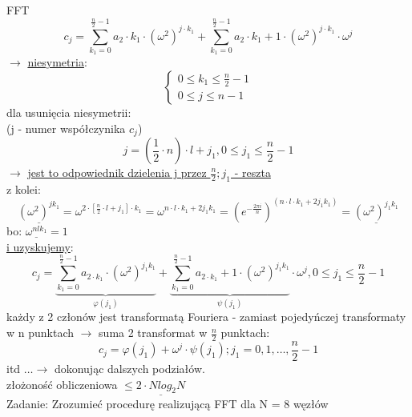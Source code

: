 \begin{frame}[allowframebreaks]{FFT}
	\[
		c_j = \sum\limits_{k_1=0}^{\frac{n}{2} - 1} a_2 \cdot k_1 \cdot (\omega^2)^{j \cdot k_1} + \sum\limits_{k_1 = 0}^{\frac{n}{2} - 1} a_2 \cdot k_1 + 1 \cdot (\omega^2)^{j \cdot k_1} \cdot \omega^j
		\tag{16.24}
	\]
	$\to$ \underline{niesymetria}: \\
	\[
	\begin{cases}
		0 \leq k_1 \leq \frac{n}{2} - 1 \\
		0 \leq j \leq n-1
	\end{cases}
	\tag{16.25}
	\]
	dla usunięcia niesymetrii: \\
	(j - numer współczynika $c_j$)
	\[
		j = (\frac{1}{2} \cdot n) \cdot l + j_1, 0 \leq j_1 \leq \frac{n}{2} - 1
	\]
	$\to$ \underline{jest to odpowiednik dzielenia j przez $\frac{n}{2} ; j_1$ - reszta} \\
	z kolei:
	\[
		\underline{(\omega^2)^{jk_1}} = \omega^{2 \cdot [\frac{n}{2} \cdot l + j_1] \cdot k_1} = \omega^{n \cdot l \cdot k_1 + 2j_1k_1} = (e^{-\frac{2\pi i}{n}})^{(n \cdot l \cdot k_1 + 2j_1k_1)} = \underline{(\omega^2)^{j_1k_1}}
		\tag{16.26}
	\]
	bo: $\underline{\omega^{nlk_1}} = 1$ \\
	\underline{i uzyskujemy}:
	\[
		c_j = \underbrace{\sum\limits_{k_1 = 0}^{\frac{n}{2} - 1} a_{2 \cdot k_1} \cdot (\omega^2)^{j_1k_1}}_{\varphi(j_1)} + \underbrace{ \sum\limits_{k_1 = 0}^{\frac{n}{2}-1} a_{2 \cdot k_1} + 1 \cdot (\omega^2)^{j_1k_1}}_{\psi(j_1)} \cdot \omega^j, 0\leq j_1 \leq \frac{n}{2} - 1
		\tag{16.27}
	\]
	każdy z 2 członów jest transformatą Fouriera - zamiast pojedyńczej transformaty w n punktach $\to$ suma 2 transformat w $\frac{n}{2}$ punktach: 
	\[
		c_j = \varphi(j_1) + \omega^j \cdot \psi(j_1) ; j_1 = 0, 1, \dots, \frac{n}{2} - 1
		\tag{16.28}
	\]
	itd $\dots \to$ dokonując dalszych podziałów. \\
	złożoność obliczeniowa $\leq \underline{2 \cdot Nlog_2N}$ \\
	Zadanie: Zrozumieć procedurę realizującą FFT dla N = 8 węzłów
\end{frame}   